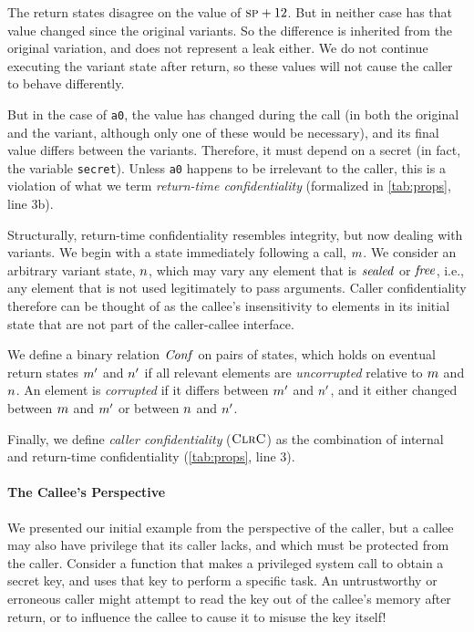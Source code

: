 \documentclass[10pt,conference]{ieeetran}%
\theoremstyle{definition}
\begin{document}
The return states disagree on the value of \(\textsc{sp} + 12\). But in neither
case has that value changed since the original variants. So the difference is inherited from
the original variation, and does not represent a leak either. We do not continue executing the
variant state after return, so these values will not cause the caller to behave differently.

But in the case of {\tt a0}, the value has changed during the call (in both the original
and the variant, although only one of these would be necessary), and its final value
differs between the variants.
Therefore, it must depend on a secret (in fact, the variable {\tt secret}).
Unless {\tt a0} happens to be irrelevant to the caller, this is a violation of what
we term {\it return-time confidentiality} (formalized in \cref{tab:props}, line 3b).

Structurally, return-time confidentiality resembles integrity, but now dealing with
variants. We begin with a state immediately following
a call, \(m\). We consider an arbitrary variant state,
\(n\), which may vary any element that is \(\mathit{sealed}\) or \(\mathit{free}\),
i.e., any element that is not used legitimately to pass arguments. Caller confidentiality
therefore can be thought of as the callee's insensitivity to elements in its initial state
that are not part of the caller-callee interface.

We define a binary relation \(\mathit{Conf}\) on pairs of states,
which holds on eventual return states \(m'\) and \(n'\)
if all relevant elements are {\em uncorrupted} relative to \(m\) and \(n\).
An element is {\em corrupted} if it differs between \(m'\) and \(n'\),
and it either changed between \(m\) and \(m'\) or between \(n\) and \(n'\).

Finally, we define \emph{caller confidentiality} (\(\textnormal{\sc ClrC}\)) as the
combination of internal and return-time confidentiality (\cref{tab:props}, line 3).

\paragraph*{The Callee's Perspective}

We presented our initial example from the perspective of the caller, but a callee
may also have privilege that its caller lacks, and which must be protected from the
caller. Consider a function that makes a privileged system call to obtain a secret key,
and uses that key to perform a specific task. An untrustworthy or erroneous caller might
attempt to read the key out of the callee's memory after return, or to influence the callee
to cause it to misuse the key itself!
\end{document}
